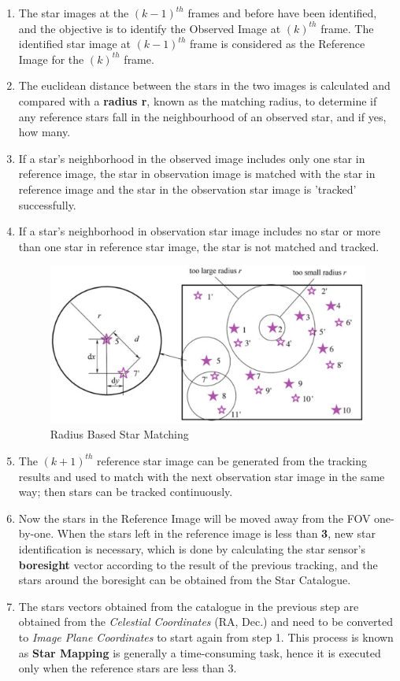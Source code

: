 \documentclass[../../main.tex]{subfiles}
\begin{document}
\begin{enumerate}
    \item The star images at the $(k-1)^{th}$ frames and before have been identified, and the objective is to identify the Observed Image at $(k)^{th}$ frame. The identified star image at $(k-1)^{th}$ frame is considered as the Reference Image for the $(k)^{th}$ frame. 
    \item The euclidean distance between the stars in the two images is calculated and compared with a \textbf{radius r}, known as the matching radius, to determine if any reference stars fall in the neighbourhood of an observed star, and if yes, how many. 
    \item If a star's neighborhood in the observed image includes only one star in reference image, the star in observation image is matched with the star in reference image and the star in the observation star image is 'tracked' successfully.
    \item If a star's neighborhood in observation star image includes no
    star or more than one star in reference star image, the star is not matched and tracked. 
    \begin{figure}[!h]
        \centering
        \includegraphics[scale=0.3]{Figures/GNC/radius_based_zhang.png}
        \caption{Radius Based Star Matching}
        \label{fig:radius_zhang}
    \end{figure}
    \item The $(k+1)^{th}$ reference star image can be generated from the tracking results and used to match with the next observation star image in the same way; then stars can be tracked continuously.
    \item Now the stars in the Reference Image will be moved away from the FOV one-by-one. When the stars left in the reference image is less than \textbf{3}, new star identification is necessary, which is done by calculating the star sensor's \textbf{boresight} vector according to the result of the previous tracking, and the stars around the boresight can be obtained from the Star Catalogue.  
    \item The stars vectors obtained from the catalogue in the previous step are obtained from the \textit{Celestial Coordinates} (RA, Dec.) and need to be converted to \textit{Image Plane Coordinates} to start again from step 1. This process is known as \textbf{Star Mapping} is generally a time-consuming task, hence it is executed only when the reference stars are less than 3. 
\end{enumerate}
\end{document}
